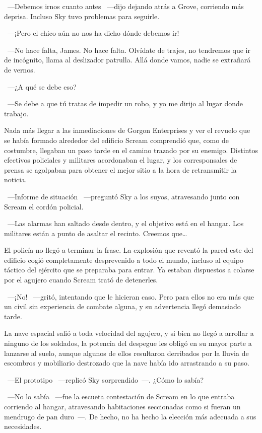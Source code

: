 ~---Debemos irnos cuanto antes ~---dijo dejando atrás a Grove, corriendo más deprisa. Incluso Sky tuvo problemas para seguirle.

~---¡Pero el chico aún no nos ha dicho dónde debemos ir!

~---No hace falta, James. No hace falta. Olvídate de trajes, no tendremos que ir de incógnito, llama al deslizador patrulla. Allá donde vamos, nadie se extrañará de vernos.

~---¿A qué se debe eso?

~---Se debe a que tú tratas de impedir un robo, y yo me dirijo al lugar donde trabajo.

\bigskip\noindent
Nada más llegar a las inmediaciones de Gorgon Enterprises y ver el revuelo que se había formado alrededor del edificio Scream comprendió que, como de costumbre, llegaban un paso tarde en el camino trazado por su enemigo. Distintos efectivos policiales y militares acordonaban el lugar, y los corresponsales de prensa se agolpaban para obtener el mejor sitio a la hora de retransmitir la noticia.

~---Informe de situación ~---preguntó Sky a los suyos, atravesando junto con Scream el cordón policial.

~---Las alarmas han saltado desde dentro, y el objetivo está en el hangar. Los militares están a punto de asaltar el recinto. Creemos que\dots

El policía no llegó a terminar la frase. La explosión que reventó la pared este del edificio cogió completamente desprevenido a todo el mundo, incluso al equipo táctico del ejército que se preparaba para entrar. Ya estaban dispuestos a colarse por el agujero cuando Scream trató de detenerles.

~---¡No! ~---gritó, intentando que le hicieran caso. Pero para ellos no era más que un civil sin experiencia de combate alguna, y su advertencia llegó demasiado tarde.

La nave espacial salió a toda velocidad del agujero, y si bien no llegó a arrollar a ninguno de los soldados, la potencia del despegue les obligó en su mayor parte a lanzarse al suelo, aunque algunos de ellos resultaron derribados por la lluvia de escombros y mobiliario destrozado que la nave había ido arrastrando a su paso.

~---El prototipo ~---replicó Sky sorprendido~---. ¿Cómo lo sabía?

~---No lo sabía ~---fue la escueta contestación de Scream en lo que entraba corriendo al hangar, atravesando habitaciones seccionadas como si fueran un mendrugo de pan duro~---. De hecho, no ha hecho la elección más adecuada a sus necesidades.

